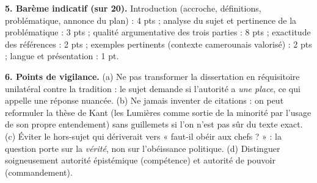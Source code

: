 \documentclass[11pt]{article}
\begin{document}
\begin{corrige}
\textbf{5. Barème indicatif (sur 20).} Introduction (accroche, définitions, problématique, annonce du plan) : 4 pts ; analyse du sujet et pertinence de la problématique : 3 pts ; qualité argumentative des trois parties : 8 pts ; exactitude des références : 2 pts ; exemples pertinents (contexte camerounais valorisé) : 2 pts ; langue et présentation : 1 pt.

\textbf{6. Points de vigilance.} (a) Ne pas transformer la dissertation en réquisitoire unilatéral contre la tradition : le sujet demande si l'autorité a \emph{une place}, ce qui appelle une réponse nuancée. (b) Ne jamais inventer de citations : on peut reformuler la thèse de Kant (les Lumières comme sortie de la minorité par l'usage de son propre entendement) sans guillemets si l'on n'est pas sûr du texte exact. (c) Éviter le hors-sujet qui dériverait vers « faut-il obéir aux chefs ? » : la question porte sur la \emph{vérité}, non sur l'obéissance politique. (d) Distinguer soigneusement autorité épistémique (compétence) et autorité de pouvoir (commandement).
\end{corrige}
\end{document}
